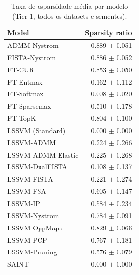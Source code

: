 \begin{table}[ht]
  \centering
  \caption{Taxa de esparsidade média por modelo (Tier 1, todos os datasets e sementes).}
  \label{tab:tier1_sparsity}
  \begin{tabular}{lr}
    \toprule
    Model & Sparsity ratio \\
    \midrule
ADMM-Nystrom & 0.889 $\pm$ 0.051 \\
FISTA-Nystrom & 0.886 $\pm$ 0.052 \\
FT-CUR & 0.853 $\pm$ 0.050 \\
FT-Entmax & 0.162 $\pm$ 0.112 \\
FT-Softmax & 0.008 $\pm$ 0.020 \\
FT-Sparsemax & 0.510 $\pm$ 0.178 \\
FT-TopK & 0.804 $\pm$ 0.100 \\
LSSVM (Standard) & 0.000 $\pm$ 0.000 \\
LSSVM-ADMM & 0.224 $\pm$ 0.266 \\
LSSVM-ADMM-Elastic & 0.225 $\pm$ 0.268 \\
LSSVM-DualFISTA & 0.108 $\pm$ 0.137 \\
LSSVM-FISTA & 0.221 $\pm$ 0.274 \\
LSSVM-FSA & 0.605 $\pm$ 0.147 \\
LSSVM-IP & 0.584 $\pm$ 0.234 \\
LSSVM-Nystrom & 0.784 $\pm$ 0.091 \\
LSSVM-OppMaps & 0.829 $\pm$ 0.066 \\
LSSVM-PCP & 0.767 $\pm$ 0.181 \\
LSSVM-Pruning & 0.576 $\pm$ 0.079 \\
SAINT & 0.000 $\pm$ 0.000 \\
    \bottomrule
  \end{tabular}
\end{table}